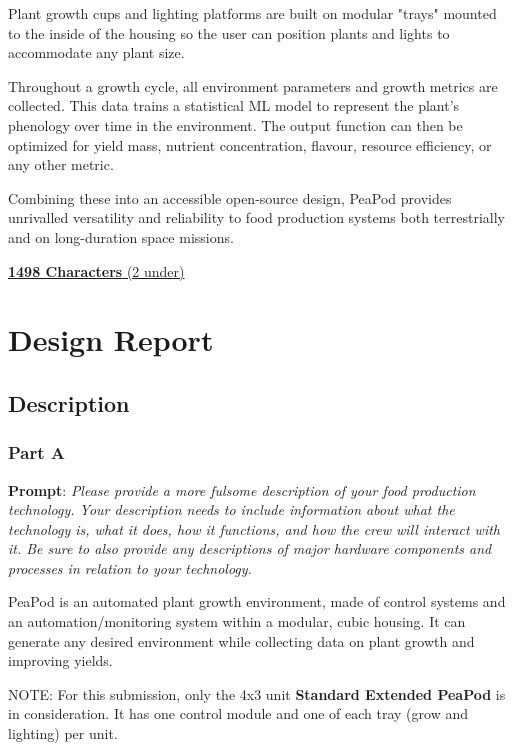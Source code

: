\documentclass{../tex/report}
\begin{document}
Plant growth cups and lighting platforms are built on modular "trays" mounted to the inside of the housing so the user can position plants and lights to accommodate any plant size.

Throughout a growth cycle, all environment parameters and growth metrics are collected. This data trains a statistical ML model to represent the plant's phenology over time in the environment. The output function can then be optimized for yield mass, nutrient concentration, flavour, resource efficiency, or any other metric.

Combining these into an accessible open-source design, PeaPod provides unrivalled versatility and reliability to food production systems both terrestrially and on long-duration space missions.

\uline{\textbf{1498 Characters} (2 under)}

\newpage

\section{Design Report}

\subsection{Description}
\label{sec:description}

\subsubsection{Part A}
\label{sec:description-a}

\textbf{Prompt}: \textit{Please provide a more fulsome description of your food production technology. Your description needs to include information about what the technology is, what it does, how it functions, and how the crew will interact with it. Be sure to also provide any descriptions of major hardware components and processes in relation to your technology.}

PeaPod is an automated plant growth environment, made of control systems and an automation/monitoring system within a modular, cubic housing. It can generate any desired environment while collecting data on plant growth and improving yields.

NOTE: For this submission, only the 4x3 unit \textbf{Standard Extended PeaPod} is in consideration. It has one control module and one of each tray (grow and lighting) per unit.
\end{document}

